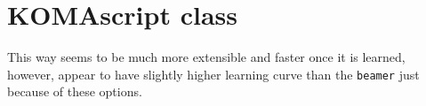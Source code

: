 \section{KOMAscript class}

This way seems to be much more extensible and faster once it is learned,
however, appear to have slightly higher learning curve than the \verb|beamer|
just because of these options.






